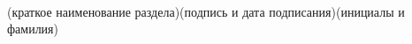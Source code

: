 \begin{titlepage}
\begin{flushleft}
\underline{\hspace{7.5cm}}\hspace{1cm}\underline{\hspace{4cm}}\hspace{1cm}\underline{\hspace{4cm}}\\
\vspace{-.2cm}\hspace{1.5cm}\footnotesize(краткое наименование раздела)\hspace{2cm}(подпись и дата подписания)\hspace{1.1cm}(инициалы и фамилия)\normalsize\\
\end{flushleft}
\thispagestyle{empty}
\end{titlepage}
\setcounter{page}{3}